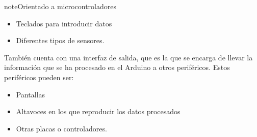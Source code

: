 \documentclass[letterpaper,10pt,spanish]{sphinxmanual}
\begin{document}
\begin{sphinxadmonition}{note}{Orientado a micro\sphinxhyphen{}controladores}
\begin{itemize}
\item {} 
\sphinxAtStartPar
Teclados para introducir datos

\item {} 
\sphinxAtStartPar
Diferentes tipos de sensores.

\end{itemize}

\sphinxAtStartPar
También cuenta con una interfaz de salida, que es la que se encarga de llevar la información que se ha procesado en el Arduino a otros periféricos. Estos periféricos pueden ser:
\begin{itemize}
\item {} 
\sphinxAtStartPar
Pantallas

\item {} 
\sphinxAtStartPar
Altavoces en los que reproducir los datos procesados

\item {} 
\sphinxAtStartPar
Otras placas o controladores.

\end{itemize}
\end{sphinxadmonition}
\end{document}

